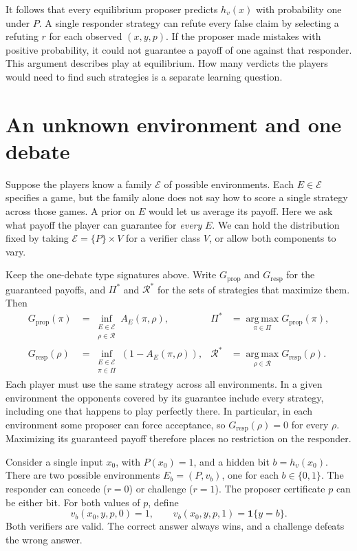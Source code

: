 \documentclass[11pt]{article}
\newcommand{\argmax}{\operatorname*{arg\,max}}
\begin{document}
It follows that every equilibrium proposer predicts \(h_v(x)\) with
probability one under \(P\). A single responder strategy can refute every
false claim by selecting a refuting \(r\) for each observed \((x,y,p)\).
If the proposer made mistakes with positive probability, it could not
guarantee a payoff of one against that responder. This argument describes
play at equilibrium. How many verdicts the players would need to find such
strategies is a separate learning question.

\section{An unknown environment and one debate}

Suppose the players know a family \(\mathcal E\) of possible environments.
Each \(E\in\mathcal E\) specifies a game, but the family alone does not say
how to score a single strategy across those games. A prior on \(E\) would
let us average its payoff. Here we ask what payoff the player can guarantee
for \emph{every} \(E\). We can hold the distribution fixed by taking
\(\mathcal E=\{P\}\times V\) for a verifier class \(V\), or allow both
components to vary.

Keep the one-debate type signatures above. Write \(G_{\mathrm{prop}}\) and
\(G_{\mathrm{resp}}\) for the guaranteed payoffs, and \(\Pi^*\) and
\(\mathcal R^*\) for the sets of strategies that maximize them. Then
\[
\begin{aligned}
 G_{\mathrm{prop}}(\pi)
    &=\inf_{\substack{E\in\mathcal E\\\rho\in\mathcal R}}A_E(\pi,\rho),
 &\Pi^*&=\argmax_{\pi\in\Pi}G_{\mathrm{prop}}(\pi),\\
 G_{\mathrm{resp}}(\rho)
    &=\inf_{\substack{E\in\mathcal E\\\pi\in\Pi}}(1-A_E(\pi,\rho)),
 &\mathcal R^*&=\argmax_{\rho\in\mathcal R}G_{\mathrm{resp}}(\rho).
\end{aligned}
\]
Each player must use the same strategy across all environments. In a given
environment the opponents covered by its guarantee include every strategy,
including one that happens to play perfectly there. In particular,
in each environment some proposer can force acceptance, so
\(G_{\mathrm{resp}}(\rho)=0\) for every \(\rho\). Maximizing its guaranteed payoff
therefore places no restriction on the responder.

Consider a single input \(x_0\), with \(P(x_0)=1\), and a hidden bit
\(b=h_v(x_0)\). There are two possible environments \(E_b=(P,v_b)\),
one for each \(b\in\{0,1\}\). The responder can concede (\(r=0\)) or
challenge (\(r=1\)). The proposer certificate \(p\) can be either bit.
For both values of \(p\), define
\[
    v_b(x_0,y,p,0)=1,\qquad
    v_b(x_0,y,p,1)=\mathbf 1\{y=b\}.
\]
Both verifiers are valid. The correct answer always wins, and a challenge
defeats the wrong answer.
\end{document}
